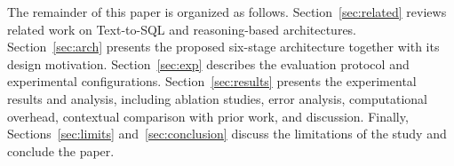 \documentclass{svproc}
\begin{document}
The remainder of this paper is organized as follows. Section~\ref{sec:related} reviews related work on Text-to-SQL and reasoning-based architectures. Section~\ref{sec:arch} presents the proposed six-stage architecture together with its design motivation. Section~\ref{sec:exp} describes the evaluation protocol and experimental configurations. Section~\ref{sec:results} presents the experimental results and analysis, including ablation studies, error analysis, computational overhead, contextual comparison with prior work, and discussion. Finally, Sections~\ref{sec:limits} and~\ref{sec:conclusion} discuss the limitations of the study and conclude the paper.







\end{document}
